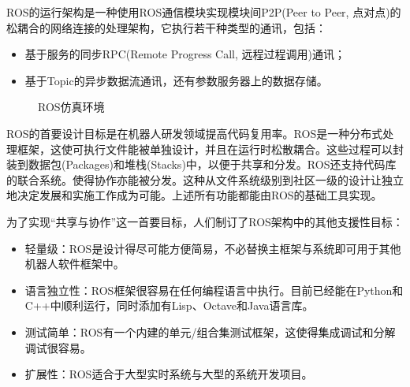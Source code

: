 \documentclass[bachelor]{thesis-uestc}
\begin{document}
	ROS的运行架构是一种使用ROS通信模块实现模块间P2P(Peer to Peer, 点对点)的松耦合的网络连接的处理架构，它执行若干种类型的通讯，包括：
	\begin{itemize}
		\item 基于服务的同步RPC(Remote Progress Call, 远程过程调用)通讯；
		\item 基于Topic的异步数据流通讯，还有参数服务器上的数据存储。
	\end{itemize}
	\begin{figure}[h]
		\centering
		\caption{ROS仿真环境}
	\end{figure}

	ROS的首要设计目标是在机器人研发领域提高代码复用率。ROS是一种分布式处理框架，这使可执行文件能被单独设计，并且在运行时松散耦合。这些过程可以封装到数据包(Packages)和堆栈(Stacks)中，以便于共享和分发。ROS还支持代码库的联合系统。使得协作亦能被分发。这种从文件系统级别到社区一级的设计让独立地决定发展和实施工作成为可能。上述所有功能都能由ROS的基础工具实现。
	
	为了实现“共享与协作”这一首要目标，人们制订了ROS架构中的其他支援性目标：
	
	\begin{itemize}
		\item 轻量级：ROS是设计得尽可能方便简易，不必替换主框架与系统即可用于其他机器人软件框架中。
		
		\item 语言独立性：ROS框架很容易在任何编程语言中执行。目前已经能在Python和C++中顺利运行，同时添加有Lisp、Octave和Java语言库。
		
		\item 测试简单：ROS有一个内建的单元/组合集测试框架，这使得集成调试和分解调试很容易。
		
		\item 扩展性：ROS适合于大型实时系统与大型的系统开发项目。
	\end{itemize}
\end{document}
